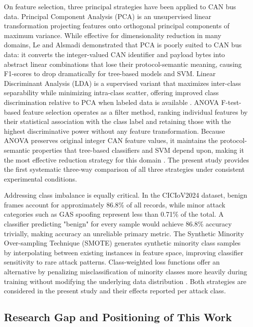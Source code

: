 \documentclass[conference]{IEEEtran}
\begin{document}
On feature selection, three principal strategies have been applied to CAN bus data. Principal Component Analysis (PCA) is an unsupervised linear transformation projecting features onto orthogonal principal components of maximum variance. While effective for dimensionality reduction in many domains, Le and Alsmadi \cite{article_emre} demonstrated that PCA is poorly suited to CAN bus data: it converts the integer-valued CAN identifier and payload bytes into abstract linear combinations that lose their protocol-semantic meaning, causing F1-scores to drop dramatically for tree-based models and SVM. Linear Discriminant Analysis (LDA) is a supervised variant that maximizes inter-class separability while minimizing intra-class scatter, offering improved class discrimination relative to PCA when labeled data is available \cite{NABI2024100033}. ANOVA F-test-based feature selection operates as a filter method, ranking individual features by their statistical association with the class label and retaining those with the highest discriminative power without any feature transformation. Because ANOVA preserves original integer CAN feature values, it maintains the protocol-semantic properties that tree-based classifiers and SVM depend upon, making it the most effective reduction strategy for this domain \cite{article_emre}. The present study provides the first systematic three-way comparison of all three strategies under consistent experimental conditions.

Addressing class imbalance is equally critical. In the CICIoV2024 dataset, benign frames account for approximately 86.8\% of all records, while minor attack categories such as GAS spoofing represent less than 0.71\% of the total. A classifier predicting "benign" for every sample would achieve 86.8\% accuracy trivially, making accuracy an unreliable primary metric. The Synthetic Minority Over-sampling Technique (SMOTE) \cite{Chawla_2002} generates synthetic minority class samples by interpolating between existing instances in feature space, improving classifier sensitivity to rare attack patterns. Class-weighted loss functions offer an alternative by penalizing misclassification of minority classes more heavily during training without modifying the underlying data distribution \cite{electronics14010069}. Both strategies are considered in the present study and their effects reported per attack class.

\subsection{Research Gap and Positioning of This Work}
\end{document}
